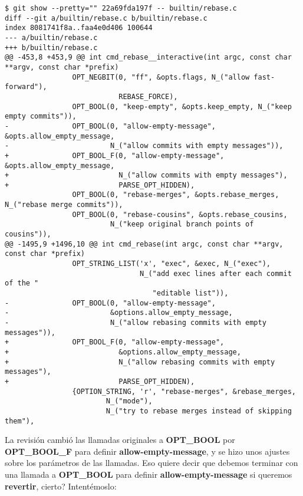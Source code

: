 \begin{lstlisting}[style=console_style,
	basicstyle=\tiny,
	caption={\bf Ejemplo 13} - Revisión original]
$ git show --pretty="" 22a69fda197f -- builtin/rebase.c
diff --git a/builtin/rebase.c b/builtin/rebase.c
index 8081741f8a..faa4e0d406 100644
--- a/builtin/rebase.c
+++ b/builtin/rebase.c
@@ -453,8 +453,9 @@ int cmd_rebase__interactive(int argc, const char **argv, const char *prefix)
                OPT_NEGBIT(0, "ff", &opts.flags, N_("allow fast-forward"),
                           REBASE_FORCE),
                OPT_BOOL(0, "keep-empty", &opts.keep_empty, N_("keep empty commits")),
-               OPT_BOOL(0, "allow-empty-message", &opts.allow_empty_message,
-                        N_("allow commits with empty messages")),
+               OPT_BOOL_F(0, "allow-empty-message", &opts.allow_empty_message,
+                          N_("allow commits with empty messages"),
+                          PARSE_OPT_HIDDEN),
                OPT_BOOL(0, "rebase-merges", &opts.rebase_merges, N_("rebase merge commits")),
                OPT_BOOL(0, "rebase-cousins", &opts.rebase_cousins,
                         N_("keep original branch points of cousins")),
@@ -1495,9 +1496,10 @@ int cmd_rebase(int argc, const char **argv, const char *prefix)
                OPT_STRING_LIST('x', "exec", &exec, N_("exec"),
                                N_("add exec lines after each commit of the "
                                   "editable list")),
-               OPT_BOOL(0, "allow-empty-message",
-                        &options.allow_empty_message,
-                        N_("allow rebasing commits with empty messages")),
+               OPT_BOOL_F(0, "allow-empty-message",
+                          &options.allow_empty_message,
+                          N_("allow rebasing commits with empty messages"),
+                          PARSE_OPT_HIDDEN),
                {OPTION_STRING, 'r', "rebase-merges", &rebase_merges,
                        N_("mode"),
                        N_("try to rebase merges instead of skipping them"),
\end{lstlisting}

La revisión cambió las llamadas originales a {\bf OPT\_BOOL} por {\bf OPT\_BOOL\_F} para definir {\bf allow-empty-message}, y
se hizo unos ajustes sobre los parámetros de las llamadas. Eso quiere decir que debemos terminar con una llamada a {\bf OPT\_BOOL}
para definir {\bf allow-empty-message} si queremos {\bf revertir}, cierto? Intentémoslo:

